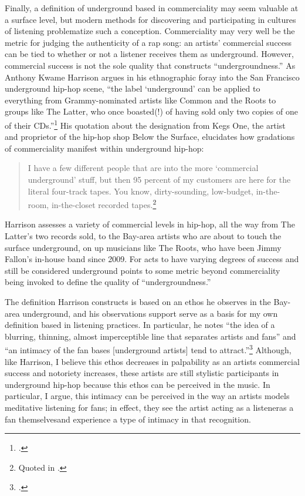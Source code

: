 Finally, a definition of underground based in commerciality may seem valuable at a surface level, but modern
methods for discovering and participating in cultures of listening problematize such a conception. Commerciality
may very well be the metric for judging the authenticity of a rap song: an artists' commercial success can be tied to
whether or not a listener receives them as underground. However, commercial success is not the sole quality that
constructs ``undergroundness.'' As Anthony Kwame Harrison argues in his ethnographic foray into the San Francisco
underground hip-hop scene, ``the label `underground' can be applied to everything from Grammy-nominated artists like
Common and the Roots to groups like The Latter, who once boasted(!) of having sold only two copies of one of their
CDs.''\footnote{
    \autocite[9]{anthonykwameharrisonHipHopUnderground2009}.}
His quotation about the designation from Kegs One, the artist and proprietor of the hip-hop shop Below the Surface, 
elucidates how gradations of commerciality manifest within underground hip-hop:

    \begin{quote}
        I have a few different people that are into the more `commercial underground' stuff, but then 95 percent of my
        customers are here for the  literal four-track tapes. You know, dirty-sounding, low-budget, in-the-room, in-the-closet
        recorded tapes.\footnote{
        Quoted in \autocite[10]{anthonykwameharrisonHipHopUnderground2009}.}
    \end{quote}
Harrison assesses a variety of commercial levels in hip-hop, all the way from The Latter's two records sold, to 
the Bay-area artists who are about to touch the surface underground, on up musicians like The Roots, who have been 
Jimmy Fallon's in-house band since 2009. For acts to have varying degrees of success and still be considered 
underground points to some metric beyond commerciality being invoked to define the quality of ``undergroundness.''

The definition Harrison constructs is based on an ethos he observes in the Bay-area underground, and his observations
support serve as a basis for my own definition based in listening practices. In particular, he notes ``the idea of a
blurring, thinning, almost imperceptible line that separates artists and fans'' and ``an intimacy of the fan bases
[underground artists] tend to attract.''\footnote{
    \autocite[10--11]{anthonykwameharrisonHipHopUnderground2009}.}
Although, like Harrison, I believe this ethos decreases in palpability as an artists commercial success and notoriety
increases, these artists are still stylistic participants in underground hip-hop because this ethos can be perceived
in the music. In particular, I argue, this intimacy can be perceived in the way an artists models meditative listening
for fans; in effect, they see the artist acting as a listener\textemdash as a fan themselves\textemdash and experience
a type of intimacy in that recognition.


